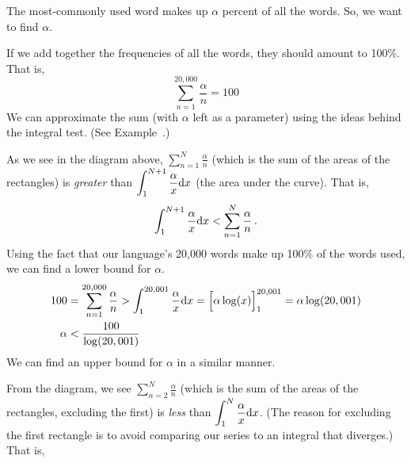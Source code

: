 \begin{solution}
	The most-commonly used word makes up $\alpha$ percent of all the words. So, we want to find $\alpha$.

	If we add together the frequencies of all the words, they should amount to 100\%. That is,
	\[\sum_{n=1}^{20,000} \frac{\alpha}{n}=100\]
	We can approximate the sum (with $\alpha$ left as a parameter) using the ideas behind the integral test. (See Example~.)
	\begin{center}
		\end{center}
	As we see in the diagram above, $\displaystyle\sum_{n=1}^N \frac{\alpha}{n}$ (which is the sum of the areas of the rectangles) is \emph{greater} than $\displaystyle\int_1^{N+1}\frac{\alpha}{x}\mathrm{d}x$ (the area under the curve). That is,
	\[\int_1^{N+1} \frac{\alpha}{x}\mathrm{d}x< \sum_{n=1}^N \frac{\alpha}{n}\,.\]
		Using the fact that our language's 20,000 words make up 100\% of the words used, we can find a lower bound for $\alpha$.
		\begin{align*}
		100&= \sum_{n=1}^{20,000} \frac{\alpha}{n}
		>\int_1^{20,001} \frac{\alpha}{x}\mathrm{d}x
		=\Big[\alpha \log(x)\Big]_{1}^{20,001}
		=\alpha\log(20,001)\\
		\alpha&<\frac{100}{\log(20,001)}
		\end{align*}
	We can find an upper bound for $\alpha$ in a similar manner.
		\begin{center}
	\end{center}
	From the diagram, we see $\displaystyle\sum_{n=2}^N \frac{\alpha}{n}$ (which is the sum of the areas of the rectangles, excluding the first) is \emph{less} than $\displaystyle\int_1^{N}\frac{\alpha}{x}\mathrm{d}x$. (The reason for excluding the first rectangle is to avoid comparing our series to an integral that diverges.) That is,

\end{solution}

